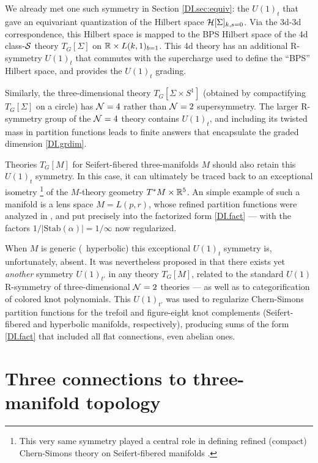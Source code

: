 \documentclass[12pt]{article}
\begin{document}
We already met one such symmetry in Section \ref{DI.sec:equiv}: the $U(1)_t$ that gave an equivariant quantization of the Hilbert space $\mathcal{H}[\Sigma]_{k,s=0}$. Via the 3d-3d correspondence, this Hilbert space is mapped to the BPS Hilbert space of the 4d class-$\mathcal{S}$ theory $T_G[\Sigma]$ on ${\mathbb R}\times L(k,1)_{b=1}$. This 4d theory has an additional R-symmetry $U(1)_t$ that commutes with the supercharge used to define the ``BPS'' Hilbert space, and provides the $U(1)_t$ grading.

Similarly, the three-dimensional theory $T_G[\Sigma\times S^1]$ (obtained by compactifying $T_G[\Sigma]$ on a circle) has $\mathcal{N}=4$ rather than $\mathcal{N}=2$ supersymmetry. The larger R-symmetry group of the $\mathcal{N}=4$ theory contains $U(1)_t$, and including its twisted mass in partition functions leads to finite answers that encapsulate the graded dimension \eqref{DI.grdim}.

Theories $T_G[M]$ for Seifert-fibered three-manifolds $M$ should also retain this $U(1)_t$ symmetry. In this case, it can ultimately be traced back to an exceptional isometry%
%
\footnote{This very same symmetry played a central role in defining refined (compact) Chern-Simons theory on Seifert-fibered manifolds \cite{DIAS-refinedCS}.} %
%
 of the $M$-theory geometry $T^*M\times {\mathbb R}^5$. An simple example of such a manifold is a lens space $M=L(p,r)$, whose refined partition functions were analyzed in \cite{DIPeiKe}, and put precisely into the factorized form \eqref{DI.fact} --- with the factors $1/|\text{Stab}(\alpha)| = 1/\infty$ now regularized.

When $M$ is generic (\DIeg\ hyperbolic) this exceptional $U(1)_t$ symmetry is, unfortunately, absent. It was nevertheless proposed in \cite{DICDGS} that there exists yet \emph{another} symmetry $U(1)_{t'}$ in any theory $T_G[M]$, related to the standard $U(1)$ R-symmetry of three-dimensional $\mathcal{N}=2$ theories --- as well as to categorification of colored knot polynomials. This $U(1)_{t'}$ was used to regularize Chern-Simons partition functions for the trefoil and figure-eight knot complements (Seifert-fibered and hyperbolic manifolds, respectively), producing sums of the form \eqref{DI.fact} that included all flat connections, even abelian ones.





\section{Three connections to three-manifold topology}
\label{DI.sec:topol}
\end{document}
